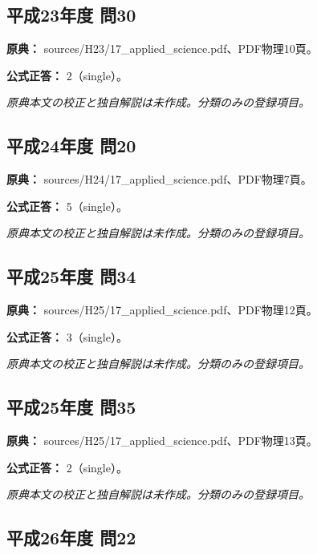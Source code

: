 \subsection{平成23年度 問30}
\label{q:h23-reg-applied-30}

\noindent\textbf{原典：} sources/H23/17\_applied\_science.pdf、PDF物理10頁。

\textbf{公式正答：} 2（single）。

\par\textit{原典本文の校正と独自解説は未作成。分類のみの登録項目。}

\subsection{平成24年度 問20}
\label{q:h24-reg-applied-20}

\noindent\textbf{原典：} sources/H24/17\_applied\_science.pdf、PDF物理7頁。

\textbf{公式正答：} 5（single）。

\par\textit{原典本文の校正と独自解説は未作成。分類のみの登録項目。}

\subsection{平成25年度 問34}
\label{q:h25-reg-applied-34}

\noindent\textbf{原典：} sources/H25/17\_applied\_science.pdf、PDF物理12頁。

\textbf{公式正答：} 3（single）。

\par\textit{原典本文の校正と独自解説は未作成。分類のみの登録項目。}

\subsection{平成25年度 問35}
\label{q:h25-reg-applied-35}

\noindent\textbf{原典：} sources/H25/17\_applied\_science.pdf、PDF物理13頁。

\textbf{公式正答：} 2（single）。

\par\textit{原典本文の校正と独自解説は未作成。分類のみの登録項目。}

\subsection{平成26年度 問22}
\label{q:h26-reg-applied-22}

